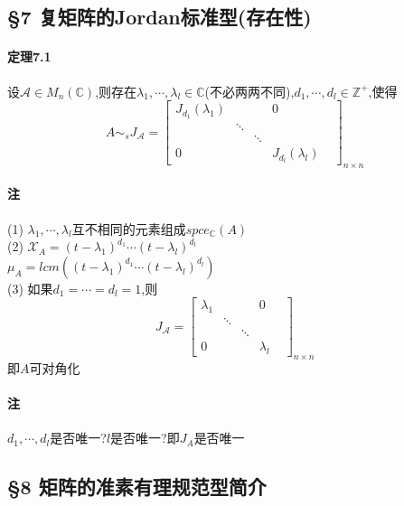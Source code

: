 \documentclass{ctexart}
\begin{document}
\fi

\subsection{§7 复矩阵的Jordan标准型(存在性)}
\paragraph{定理7.1}
设$\mathcal{A} \in M_{n}(\mathbb{C})$,则存在$\lambda_{1},\cdots,\lambda_{l} \in \mathbb{C}$(不必两两不同),$d_{1},\cdots,d_{l} \in \mathbb{Z}^{+}$,使得
$$
 A\sim_{s}J_{\mathcal{A}}=
 \left[
 \begin{matrix}
  J_{d_{1}}(\lambda_{1}) &   &   & 0 \\
    & \ddots &   &   & \\
     &   & \ddots &   &  \\
  0 &   &    & J_{d_{l}}(\lambda_{l}) 
  \end{matrix}
  \right]_{n\times n}
$$

\paragraph{注}
(1) $\lambda_{1},\cdots,\lambda_{l}$互不相同的元素组成$spce_{\mathbb{C}}(A)$\\
(2) $\mathcal{X}_{A}=(t-\lambda_{1})^{d_{1}}\cdots(t-\lambda_{l})^{d_{l}}$\\
$\mu_{A}=lcm((t-\lambda_{1})^{d_{1}}\cdots(t-\lambda_{l})^{d_{l}})$\\
(3) 如果$d_{1}=\cdots=d_{l}=1$,则
$$
 J_{\mathcal{A}}=
 \left[
 \begin{matrix}
  \lambda_{1} &   &   & 0 \\
    & \ddots &   &   & \\
     &   & \ddots &   &  \\
  0 &   &    & \lambda_{l}
  \end{matrix}
  \right]_{n\times n}
$$
即$A$可对角化

\paragraph{注}
$d_{1},\cdots,d_{l}$是否唯一?$l$是否唯一?即$J_{A}$是否唯一

\subsection{§8 矩阵的准素有理规范型简介}
\end{document}
